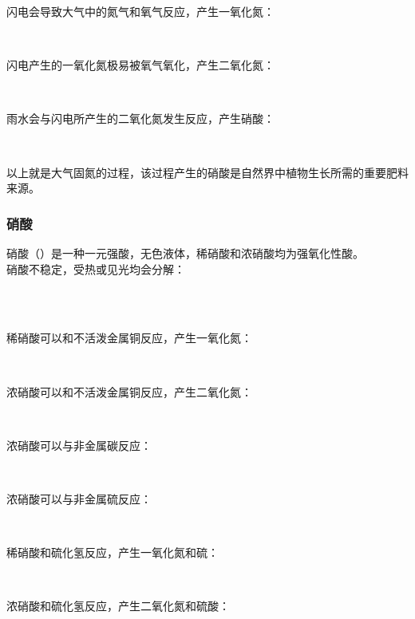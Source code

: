 \documentclass[UTF8]{ctexart}
\begin{document}
\newpage

    闪电会导致大气中的氮气和氧气反应，产生一氧化氮：
    \begin{center}
        \\[4mm]
    \end{center}
    闪电产生的一氧化氮极易被氧气氧化，产生二氧化氮：
    \begin{center}
        \\[4mm]
    \end{center}
    雨水会与闪电所产生的二氧化氮发生反应，产生硝酸：
    \begin{center}
        \\[4mm]
    \end{center}
    以上就是大气固氮的过程，该过程产生的硝酸是自然界中植物生长所需的重要肥料来源。\\

\subsubsection{硝酸}
    硝酸（）是一种一元强酸，无色液体，稀硝酸和浓硝酸均为强氧化性酸。\\[3mm]
    硝酸不稳定，受热或见光均会分解：
    \begin{center}
        \\[3mm]
        \\[4mm]
    \end{center}
    稀硝酸可以和不活泼金属铜反应，产生一氧化氮：
    \begin{center}
        \\[4mm]
    \end{center}
    浓硝酸可以和不活泼金属铜反应，产生二氧化氮：
    \begin{center}
        \\[4mm]
    \end{center}
    浓硝酸可以与非金属碳反应：
    \begin{center}
        \\[4mm]
    \end{center}
    浓硝酸可以与非金属硫反应：
    \begin{center}
        \\[6mm]
    \end{center}
    稀硝酸和硫化氢反应，产生一氧化氮和硫：
    \begin{center}
        \\[4mm]
    \end{center}
    浓硝酸和硫化氢反应，产生二氧化氮和硫酸：
    \begin{center}
    \end{center}
\end{document}
